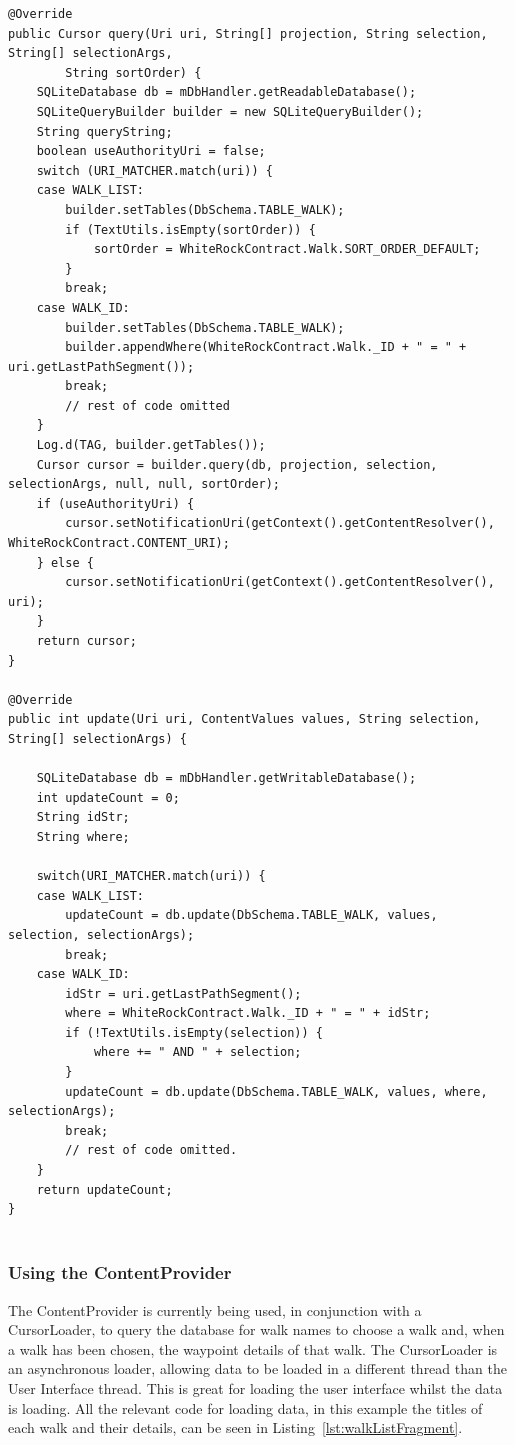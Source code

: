 \documentclass[11pt,a4paper]{article}
\begin{document}
\begin{lstlisting}[captionpos=b, caption=WhiteRockContentProvider Snippet, label=lst:contentprovider, frame=single]
@Override
public Cursor query(Uri uri, String[] projection, String selection, String[] selectionArgs,
        String sortOrder) {
    SQLiteDatabase db = mDbHandler.getReadableDatabase();
    SQLiteQueryBuilder builder = new SQLiteQueryBuilder();
    String queryString;
    boolean useAuthorityUri = false;
    switch (URI_MATCHER.match(uri)) {
    case WALK_LIST:
        builder.setTables(DbSchema.TABLE_WALK);
        if (TextUtils.isEmpty(sortOrder)) {
            sortOrder = WhiteRockContract.Walk.SORT_ORDER_DEFAULT;
        }
        break;
    case WALK_ID:
        builder.setTables(DbSchema.TABLE_WALK);
        builder.appendWhere(WhiteRockContract.Walk._ID + " = " + uri.getLastPathSegment());
        break;
        // rest of code omitted
    }
    Log.d(TAG, builder.getTables());
    Cursor cursor = builder.query(db, projection, selection, selectionArgs, null, null, sortOrder);
    if (useAuthorityUri) {
        cursor.setNotificationUri(getContext().getContentResolver(), WhiteRockContract.CONTENT_URI);
    } else {
        cursor.setNotificationUri(getContext().getContentResolver(), uri);
    }
    return cursor;
}

@Override
public int update(Uri uri, ContentValues values, String selection, String[] selectionArgs) {

    SQLiteDatabase db = mDbHandler.getWritableDatabase();
    int updateCount = 0;
    String idStr;
    String where;

    switch(URI_MATCHER.match(uri)) {
    case WALK_LIST:
        updateCount = db.update(DbSchema.TABLE_WALK, values, selection, selectionArgs);
        break;
    case WALK_ID:
        idStr = uri.getLastPathSegment();
        where = WhiteRockContract.Walk._ID + " = " + idStr;
        if (!TextUtils.isEmpty(selection)) {
            where += " AND " + selection;
        }
        updateCount = db.update(DbSchema.TABLE_WALK, values, where, selectionArgs);
        break;
        // rest of code omitted.
    }
    return updateCount;
}
	
\end{lstlisting}

\subsubsection{Using the ContentProvider}
The ContentProvider is currently being used, in conjunction with a CursorLoader, to query the database for walk names to choose a walk and, when a walk has been chosen, the waypoint details of that walk. The CursorLoader is an asynchronous loader, allowing data to be loaded in a different thread than the User Interface thread. This is great for loading the user interface whilst the data is loading. All the relevant code for loading data, in this example the titles of each walk and their details, can be seen in Listing~\ref{lst:walkListFragment}.
\end{document}
